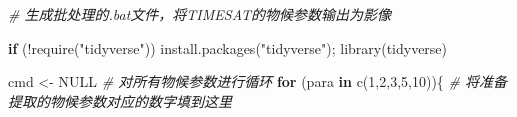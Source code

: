 \documentclass[
]{article}
\newenvironment{Shaded}{\begin{snugshade}}{\end{snugshade}}
\newcommand{\CommentTok}[1]{\textcolor[rgb]{0.56,0.35,0.01}{\textit{#1}}}
\newcommand{\ConstantTok}[1]{\textcolor[rgb]{0.00,0.00,0.00}{#1}}
\newcommand{\ControlFlowTok}[1]{\textcolor[rgb]{0.13,0.29,0.53}{\textbf{#1}}}
\newcommand{\DecValTok}[1]{\textcolor[rgb]{0.00,0.00,0.81}{#1}}
\newcommand{\FunctionTok}[1]{\textcolor[rgb]{0.00,0.00,0.00}{#1}}
\newcommand{\NormalTok}[1]{#1}
\newcommand{\OtherTok}[1]{\textcolor[rgb]{0.56,0.35,0.01}{#1}}
\newcommand{\SpecialCharTok}[1]{\textcolor[rgb]{0.00,0.00,0.00}{#1}}
\newcommand{\StringTok}[1]{\textcolor[rgb]{0.31,0.60,0.02}{#1}}
\begin{document}
\begin{Shaded}
\begin{Highlighting}[]
\CommentTok{\# 生成批处理的.bat文件，将TIMESAT的物候参数输出为影像}

\ControlFlowTok{if}\NormalTok{ (}\SpecialCharTok{!}\FunctionTok{require}\NormalTok{(}\StringTok{"tidyverse"}\NormalTok{)) }\FunctionTok{install.packages}\NormalTok{(}\StringTok{"tidyverse"}\NormalTok{); }\FunctionTok{library}\NormalTok{(tidyverse)}

\NormalTok{cmd }\OtherTok{\textless{}{-}} \ConstantTok{NULL}
\CommentTok{\# 对所有物候参数进行循环}
\ControlFlowTok{for}\NormalTok{ (para }\ControlFlowTok{in} \FunctionTok{c}\NormalTok{(}\DecValTok{1}\NormalTok{,}\DecValTok{2}\NormalTok{,}\DecValTok{3}\NormalTok{,}\DecValTok{5}\NormalTok{,}\DecValTok{10}\NormalTok{))\{ }\CommentTok{\# 将准备提取的物候参数对应的数字填到这里}
  

\end{Highlighting}
\end{Shaded}
\end{document}
